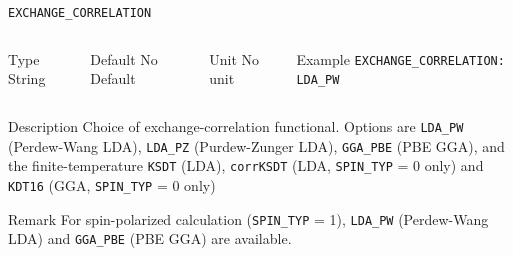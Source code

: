 \begin{frame}[allowframebreaks]{\texttt{{EXCHANGE\_CORRELATION}}} \label{EXCHANGE_CORRELATION}
\vspace*{-12pt}
\begin{columns}
\begin{block}{Type}
String
\end{block}

\begin{block}{Default}
No Default
\end{block}

\begin{block}{Unit}
No unit
\end{block}

\begin{block}{Example}
\texttt{EXCHANGE\_CORRELATION: LDA\_PW}
\end{block}
\end{columns}

\begin{block}{Description}
Choice of exchange-correlation functional. Options are \texttt{LDA\_PW} (Perdew-Wang LDA), \texttt{LDA\_PZ} (Purdew-Zunger LDA), \texttt{GGA\_PBE} (PBE GGA), and the finite-temperature \texttt{KSDT} (LDA), \texttt{corrKSDT} (LDA, \texttt{SPIN\_TYP} = 0 only) and \texttt{KDT16} (GGA, \texttt{SPIN\_TYP} = 0 only)
\end{block}

\begin{block}{Remark}
For spin-polarized calculation (\texttt{{SPIN\_TYP}} = 1),  \texttt{LDA\_PW} (Perdew-Wang LDA) and \texttt{GGA\_PBE} (PBE GGA) are available.
\end{block}


\end{frame}


